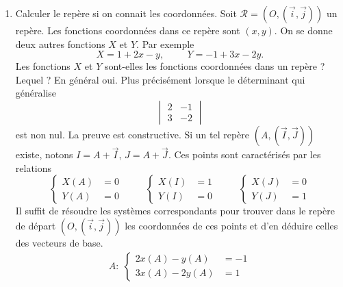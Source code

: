 \begin{enumerate}
\item Calculer le repère si on connait les coordonnées.\newline
Soit $\mathcal{R} = (O,(\overrightarrow{i},\overrightarrow{j}))$ un repère. Les fonctions coordonnées dans ce repère sont $(x,y)$. On se donne deux autres fonctions $X$ et $Y$. Par exemple
\begin{displaymath}
 X = 1 + 2x - y, \hspace{1cm} Y = -1 + 3x -2y .
\end{displaymath}
Les fonctions $X$ et $Y$ sont-elles les fonctions coordonnées dans un repère ? Lequel ?\newline
En général oui. Plus précisément lorsque le déterminant qui généralise
\begin{displaymath}
 \begin{vmatrix}
  2 & -1 \\ 3 & -2
 \end{vmatrix}
\end{displaymath}
est non nul. La preuve est constructive. \newline
Si un tel repère $(A,(\overrightarrow{I},\overrightarrow{J}))$ existe, notons $I=A+\overrightarrow{I}$, $J=A+\overrightarrow{J}$. Ces points sont caractérisés par les relations
\begin{displaymath}
 \left\lbrace 
\begin{aligned}
 X(A)&=0\\ Y(A)&=0
\end{aligned}
\right.
\hspace{1cm} 
 \left\lbrace 
\begin{aligned}
 X(I)&=1\\ Y(I)&= 0
\end{aligned}
\right.
\hspace{1cm} 
 \left\lbrace 
\begin{aligned}
 X(J)&=0\\ Y(J)&= 1
\end{aligned}
\right.
\end{displaymath}
Il suffit de résoudre les systèmes correspondants pour trouver dans le repère de départ $(O,(\overrightarrow{i},\overrightarrow{j}))$ les coordonnées de ces points et d'en déduire celles des vecteurs de base. 
\begin{multline*}
A:\;  \left\lbrace
  \begin{aligned}
    2x(A) - y(A) &= -1 \\3x(A) - 2y(A) &=1
  \end{aligned}
  \right.

\end{multline*}
\end{enumerate}
